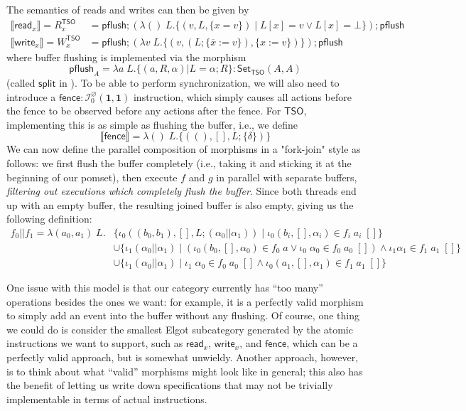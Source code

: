 \documentclass[acmsmall,screen,review]{acmart}
\newcommand{\mc}[1]{\ensuremath{\mathcal{#1}}}
\newcommand{\mb}[1]{\ensuremath{\mathbf{#1}}}
\newcommand{\ms}[1]{\ensuremath{\mathsf{#1}}}
\newcommand{\dnt}[1]{\llbracket{#1}\rrbracket}
\newcommand{\bufloc}[1]{\overline{#1}}
\begin{document}
The semantics of reads and writes can then be given by
\begin{equation}
  \begin{aligned}
  \dnt{\ms{read}_x} = R_x^{\ms{TSO}} 
    &= \ms{pflush};(\lambda ()\;L. \{(v, L, \{x = v\}) \mid L[x] = v \lor L[x] = \bot\});\ms{pflush} 
  \\
  \dnt{\ms{write}_x} = W_x^{\ms{TSO}}
    &= \ms{pflush};(\lambda v\;L. \{(v, (L;\{\bufloc{x} := v\}), \{x := v\})\});\ms{pflush}
  \end{aligned}
\end{equation}
where buffer flushing is implemented via the morphism 
$$
  \ms{pflush}_A = \lambda a\;L. \{(a, R, \alpha) | L = \alpha;R\}
  : \ms{Set}_{\ms{TSO}}(A, A)
$$
(called \(\ms{split}\) in \cite{sparky}). To be able to perform synchronization, we will also need
to introduce a \(\ms{fence}: \mc{I}^\varnothing_0(\mb{1}, \mb{1})\) instruction, which simply causes
all actions before the fence to be observed before any actions after the fence. For \(\ms{TSO}\),
implementing this is as simple as flushing the buffer, i.e., we define
$$
  \dnt{\ms{fence}} = \lambda ()\;L. \{((), [], L;\{\delta\})\}
$$
We can now define the parallel composition of morphisms in a "fork-join" style as follows: we first
flush the buffer completely (i.e., taking it and sticking it at the beginning of our pomset), then
execute \(f\) and \(g\) in parallel with separate buffers, \textit{filtering out executions which
completely flush the buffer}. Since both threads end up with an empty buffer, the resulting joined
buffer is also empty, giving us the following definition:
\begin{equation}
  \begin{aligned}
    f_0 || f_1 = \lambda (a_0, a_1)\;L. 
    & \{\iota_0 ((b_0, b_1), [], L;(\alpha_0 || \alpha_1)) 
      \mid \iota_0 (b_i, [], \alpha_i) \in f_i\;a_i\;[]\} 
    \\ & \cup \{\iota_1 (\alpha_0 || \alpha_1) 
        \mid (\iota_0 (b_0, [], \alpha_0) \in f_0\;a \lor \iota_0\;\alpha_0 \in f_0\;a_0\;[]) 
        \land \iota_1 \alpha_1 \in f_1\;a_1\;[]\} 
    \\ & \cup \{\iota_1 (\alpha_0 || \alpha_1) 
        \mid \iota_1\;\alpha_0 \in f_0\;a_0\;[] 
        \land \iota_0 (a_1, [], \alpha_1) \in f_1\;a_1\;[]\}
    \end{aligned}
\end{equation}

One issue with this model is that our category currently has ``too many'' operations besides the
ones we want: for example, it is a perfectly valid morphism to simply add an event into the buffer
without any flushing. Of course, one thing we could do is consider the smallest Elgot subcategory
generated by the atomic instructions we want to support, such as \(\ms{read}_x\), \(\ms{write}_x\),
and \(\ms{fence}\), which can be a perfectly valid approach, but is somewhat unwieldy. Another
approach, however, is to think about what ``valid'' morphisms might look like in general; this
also has the benefit of letting us write down specifications that may not be trivially implementable
in terms of actual instructions.
\end{document}
